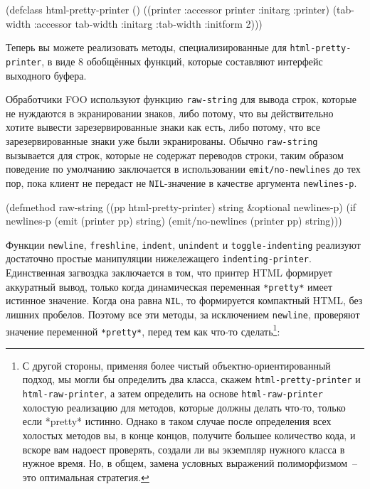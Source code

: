 \begin{myverb}
(defclass html-pretty-printer ()
  ((printer   :accessor printer   :initarg :printer)
   (tab-width :accessor tab-width :initarg :tab-width :initform 2)))
\end{myverb}

Теперь вы можете реализовать методы, специализированные для \lstinline{html-pretty-printer}, в
виде 8 обобщённых функций, которые составляют интерфейс выходного буфера.

Обработчики FOO используют функцию \lstinline{raw-string} для вывода строк, которые не
нуждаются в экранировании знаков, либо потому, что вы действительно хотите вывести
зарезервированные знаки как есть, либо потому, что все зарезервированные знаки уже были
экранированы. Обычно \lstinline{raw-string} вызывается для строк, которые не содержат переводов
строки, таким образом поведение по умолчанию заключается в использовании
\lstinline{emit/no-newlines} до тех пор, пока клиент не передаст не \lstinline{NIL}-значение в
качестве аргумента \lstinline{newlines-p}.

\begin{myverb}
(defmethod raw-string ((pp html-pretty-printer) string &optional newlines-p)
  (if newlines-p
    (emit (printer pp) string)
    (emit/no-newlines (printer pp) string)))
\end{myverb}

Функции \lstinline{newline}, \lstinline{freshline}, \lstinline{indent}, \lstinline{unindent} и
\lstinline{toggle-indenting} реализуют достаточно простые манипуляции нижележащего
\lstinline{indenting-printer}. Единственная загвоздка заключается в том, что принтер HTML
формирует аккуратный вывод, только когда динамическая переменная \lstinline{*pretty*} имеет
истинное значение. Когда она равна \lstinline{NIL}, то формируется компактный HTML, без лишних
пробелов. Поэтому все эти методы, за исключением \lstinline{newline}, проверяют значение
переменной \lstinline{*pretty*}, перед тем как что-то сделать\footnote{С другой стороны,
  применяя более чистый объектно-ориентированный подход, мы могли бы определить два
  класса, скажем \lstinline{html-pretty-printer} и \lstinline{html-raw-printer}, а затем определить
  на основе \lstinline{html-raw-printer} холостую реализацию для методов, которые должны делать
  что-то, только если *pretty* истинно. Однако в таком случае после определения всех
  холостых методов вы, в конце концов, получите большее количество кода, и вскоре вам
  надоест проверять, создали ли вы экземпляр нужного класса в нужное время. Но, в общем,
  замена условных выражений полиморфизмом~-- это оптимальная стратегия.}:

